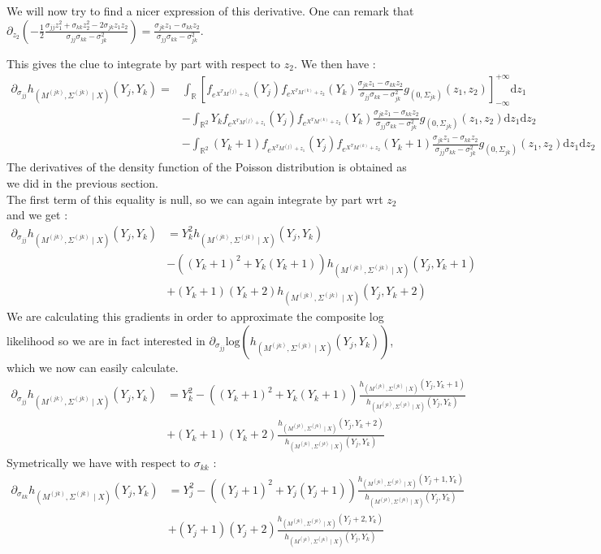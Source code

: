 \documentclass[11pt, a4paper]{article}
\begin{document}
\noindent We will now try to find a nicer expression of this derivative. One can remark that $\partial_{z_2} (-\frac{1}{2} \frac{\sigma_{jj} z_1^2 + \sigma_{kk} z_2^2 -2 \sigma_{jk} z_1 z_2}{\sigma_{jj} \sigma_{kk}-\sigma_{jk}^2}) = \frac{\sigma_{jk} z_1 - \sigma_{kk} z_2}{\sigma_{jj} \sigma_{kk}-\sigma_{jk}^2}$.

This gives the clue to integrate by part with respect to $z_2$. We then have :
\begin{align*}
\partial_{\sigma_{jj}} h_{(M^{(jk)},\Sigma^{(jk)} \mid X)}(Y_j,Y_k) =& \int_{\mathbb{R}} [  f_{e^{X^T M^{(j)}+z_1}}(Y_j) f_{e^{X^T M^{(k)}+z_2}}(Y_k) \frac{\sigma_{jk} z_1 - \sigma_{kk} z_2}{\sigma_{jj} \sigma_{kk}-\sigma_{jk}^2} g_{(0,\Sigma_{jk})}(z_1,z_2) ]_{- \infty}^{+\infty} \mathrm{d}z_1\\
 &- \int_{\mathbb{R}^2} Y_k f_{e^{X^T M^{(j)}+z_1}}(Y_j) f_{e^{X^T M^{(k)}+z_2}}(Y_k) \frac{\sigma_{jk} z_1 - \sigma_{kk} z_2}{\sigma_{jj} \sigma_{kk}-\sigma_{jk}^2} g_{(0,\Sigma_{jk})}(z_1,z_2) \mathrm{d}z_1 \mathrm{d}z_2\\
 &- \int_{\mathbb{R}^2} (Y_k+1) f_{e^{X^T  M^{(j)}+z_1}}(Y_j)  f_{e^{X^T M^{(k)}+z_2}}(Y_k+1) \frac{\sigma_{jk} z_1 - \sigma_{kk} z_2}{\sigma_{jj} \sigma_{kk}-\sigma_{jk}^2} g_{(0,\Sigma_{jk})}(z_1,z_2) \mathrm{d}z_1 \mathrm{d}z_2
\end{align*}
The derivatives of the density function of the Poisson distribution is obtained as we did in the previous section.\\
The first term of this equality is null, so we can again integrate by part wrt $z_2$ and we get :
\begin{align*}
\partial_{\sigma_{jj}} h_{(M^{(jk)},\Sigma^{(jk)} \mid X)}(Y_j,Y_k) &= Y_k^2 h_{(M^{(jk)},\Sigma^{(jk)} \mid X)}(Y_j,Y_k)\\
& - ((Y_k+1)^2 + Y_k (Y_k+1) ) h_{(M^{(jk)},\Sigma^{(jk)} \mid X)}(Y_j,Y_k+1) \\
& + (Y_k+1)(Y_k+2) h_{(M^{(jk)},\Sigma^{(jk)} \mid X)}(Y_j,Y_k+2)
\end{align*} 
We are calculating this gradients in order to approximate the composite log likelihood so we are in fact interested in $\partial_{\sigma_{jj}} \mathrm{log}(h_{(M^{(jk)},\Sigma^{(jk)} \mid X)}(Y_j,Y_k))$, which we now can easily calculate.
\begin{align*}
\partial_{\sigma_{jj}} h_{(M^{(jk)},\Sigma^{(jk)} \mid X)}(Y_j,Y_k) &= Y_k^2 - ((Y_k+1)^2 + Y_k (Y_k+1) ) \frac{h_{(M^{(jk)},\Sigma^{(jk)} \mid X)}(Y_j,Y_k+1) } {h_{(M^{(jk)},\Sigma^{(jk)} \mid X)}(Y_j,Y_k)}\\
& + (Y_k+1)(Y_k+2)\frac{ h_{(M^{(jk)},\Sigma^{(jk)} \mid X)}(Y_j,Y_k+2)}{h_{(M^{(jk)},\Sigma^{(jk)} \mid X)}(Y_j,Y_k)}
\end{align*}
Symetrically we have with respect to $\sigma_{kk}$ :
\begin{align*}
\partial_{\sigma_{kk}} h_{(M^{(jk)},\Sigma^{(jk)} \mid X)}(Y_j,Y_k) &= Y_j^2 - ((Y_j+1)^2 + Y_j (Y_j+1) ) \frac{h_{(M^{(jk)},\Sigma^{(jk)} \mid X)}(Y_j+1,Y_k) } {h_{(M^{(jk)},\Sigma^{(jk)} \mid X)}(Y_j,Y_k)}\\
& + (Y_j+1)(Y_j+2)\frac{ h_{(M^{(jk)},\Sigma^{(jk)} \mid X)}(Y_j+2,Y_k)}{h_{(M^{(jk)},\Sigma^{(jk)} \mid X)}(Y_j,Y_k)}
\end{align*}
\end{document}
